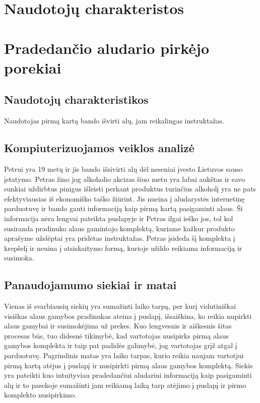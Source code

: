 \documentclass[oneside]{VUMIFPSkursinis}
\begin{document}
\section{Naudotojų charakteristos}

\section{Pradedančio aludario pirkėjo porekiai}
	\subsection{Naudotojų charakteristikos}
		Naudotojas pirmą kartą bando išvirti alų, jam reikalingas instruktažas.
	\subsection{Kompiuterizuojamos veiklos analizė}
		Petrui yra 19 metų ir jis bando išsivirti alų dėl neseniai įvesto Lietuvos sauso įstatymo.
		Petras žino jog alkoholio akcizas šiuo metu yra labai aukštas ir savo sunkiai uždirbtus pinigus išleisti perkant produktus turinčius alkoholį yra ne pats efektyviausias iš ekonomiško taško žiūrint.
		Jis nueina į aludarystės internetinę parduotuvę ir bando gauti informaciją kaip pirmą kartą pasigaminti alaus.
		Ši informacija nėra lengvai pateikta puslapyje ir Petras ilgai ieško jos, tol kol susiranda pradinuko alaus gamintojo komplektą, kuriame kažkur produkto aprašyme užslėptai yra pridėtas instruktažas.
		Petras įsideda šį komplekta į krepšelį ir neuina į atsiskaitymo formą, kurioje užildo reikiama informaciją ir susimoka.
	\subsection{Panaudojamumo siekiai ir matai}
		Vienas iš svarbiausių siekių yra sumažinti laiko tarpą, per kurį vidutiniškai visiškas alaus gamybos pradinukas ateina į puslapį, išsaiškina, ko reikia nupirkti alaus gamybai ir susimokėjima už prekes.
		Kuo lengvesnis ir aiškesnis šitas procesas būs, tuo didesnė tikimybė, kad vartotojas nusipirks pirmą alaus gamybos komplekta ir taip pat padidės galimybė, jog vartotojas grįž atgal į parduotuvę.
		Pagrindinis matas yra laiko tarpas, kurio reikia naujam vartotjui pirmą kartą atėjus į puslapį ir nusipirkti pirmą alaus gamybos komplektą.
		Siekis yra pateikti kuo intuityviau pradedančiui aludariui informaciją kaip pasigaminti alų ir to pasekoje sumažinti jam reikiamą laiką tarp atėjimo į puslapį ir pirmo komplekto nusipirkimo.
\end{document}

